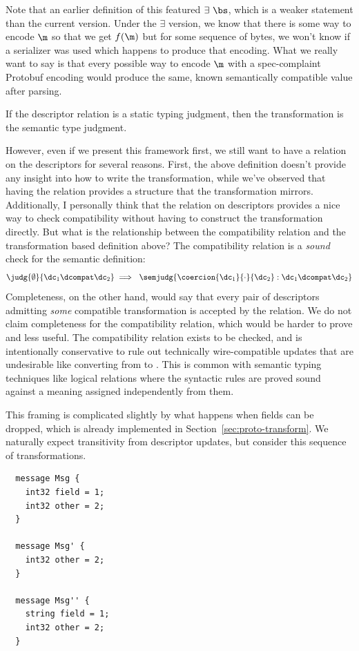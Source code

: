 Note that an earlier definition of this featured $\exists\ \bs$, which is a weaker
statement than the current version. Under the $\exists$ version, we know that there is
some way to encode $\m$ so that we get $f(\m)$ but for some sequence of bytes, we
won't know if a serializer was used which happens to produce that encoding. What
we really want to say is that every possible way to encode $\m$ with a
spec-complaint Protobuf encoding would produce the same, known semantically
compatible value after parsing.

If the descriptor relation is a static typing judgment, then the transformation
is the semantic type judgment.

However, even if we present this framework first, we still want to have a
relation on the descriptors for several reasons. First, the above definition
doesn't provide any insight into how to write the transformation, while we've
observed that having the relation provides a structure that the transformation
mirrors. Additionally, I personally think that the relation on descriptors
provides a nice way to check compatibility without having to construct the
transformation directly. But what is the relationship between the compatibility
relation and the transformation based definition above? The compatibility
relation is a \emph{sound} check for the semantic definition:
\[ \judg{\emptyset}{\dc_1 \dcompat \dc_2} \implies\ \semjudg{ \coercion{\dc_1}{\cdot}{\dc_2} : \dc_1
    \dcompat \dc_2} \]
Completeness, on the other hand, would say that every pair
of descriptors admitting \emph{some} compatible transformation is accepted by
the relation. We do not claim completeness for the compatibility relation, which
would be harder to prove and less useful. The compatibility relation exists to
be checked, and is intentionally conservative to rule out technically
wire-compatible updates that are undesirable like converting from \double{} to
\fixeds{}. This is common with semantic typing techniques like logical relations
where the syntactic rules are proved sound against a meaning assigned
independently from them.

This framing is complicated slightly by what happens when fields can be dropped,
which is already implemented in Section~\ref{sec:proto-transform}. We naturally
expect transitivity from descriptor updates, but consider this sequence of
transformations.

\begin{verbatim}
  message Msg {
    int32 field = 1;
    int32 other = 2;
  } 

  message Msg' {
    int32 other = 2;
  }

  message Msg'' {
    string field = 1;
    int32 other = 2;
  }
\end{verbatim}

